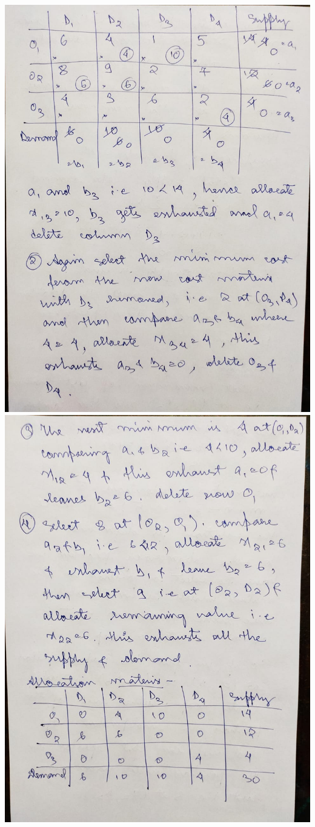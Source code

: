\documentclass[12pt, letterpaper, twoside]{book}
\begin{document}
\includegraphics[width=\paperwidth, height=\paperheight]{Page4}
\includegraphics[width=\paperwidth, height=\paperheight]{Page5}
\end{document}
